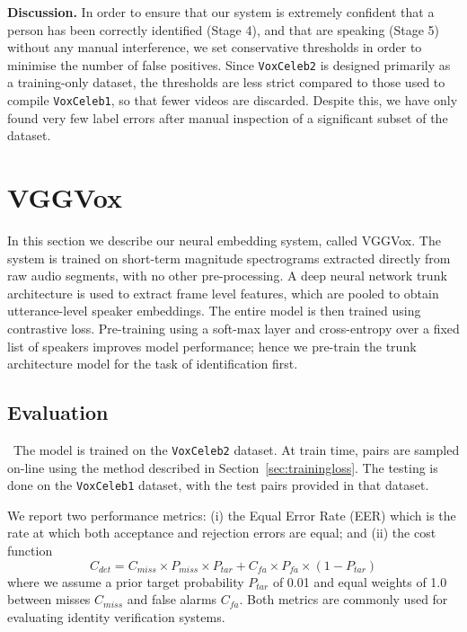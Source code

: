 \documentclass[a4paper]{article}
\def\newpara{\vspace{2pt}}
\def\subsec{\vspace{-5pt}}
\begin{document}
\newpara\noindent\textbf{Discussion. }  
In order to ensure that our system is extremely confident that a
person has been correctly
identified (Stage 4), and that are 
speaking 
 (Stage 5) without any manual interference, we set 
conservative thresholds in order to minimise the
number of false positives.  
Since \texttt{VoxCeleb2} is designed primarily as a training-only dataset,
the thresholds are less strict compared to those used to compile
\texttt{VoxCeleb1}, so that fewer videos are discarded.
Despite this, we have only found very few label errors after manual inspection
of a significant subset of the dataset.



\section{VGGVox}
\label{sec:vggvox}

In this section we describe our neural embedding system, called VGGVox.
  The system is trained on short-term magnitude spectrograms extracted directly from raw audio segments, with no other pre-processing. A deep
neural network trunk architecture is used to extract frame level
features, which are pooled to obtain utterance-level speaker
embeddings. The entire model is then trained using contrastive loss.
Pre-training using a soft-max layer and cross-entropy over a
fixed list of speakers improves model performance; hence we pre-train
the trunk architecture model for the task of identification first.

\subsection{Evaluation}
\subsec
\
The model is trained on the \texttt{VoxCeleb2} dataset.
At train time, pairs are sampled on-line using the method described in 
Section~\ref{sec:trainingloss}. The testing is done on the
\texttt{VoxCeleb1} dataset, with the test pairs provided
in that dataset.

We report two performance metrics:
(i) the Equal Error Rate (EER) which is the rate at 
which both acceptance and rejection errors are equal;
and
(ii) the cost function 
\begin{equation}
  C_{det} = C_{miss} \times P_{miss} \times P_{tar} + C_{fa} \times P_{fa} \times (1-P_{tar})
  \label{equ:cdet}
\end{equation}
where we assume a prior target probability $P_{tar}$ of 0.01 and
equal weights of 1.0 between misses $C_{miss}$ and false alarms $C_{fa}$.
Both metrics are commonly used for evaluating  identity 
verification systems.
\end{document}
